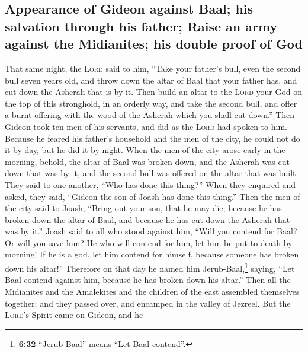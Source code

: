 \hypertarget{appearance-of-gideon-against-baal-his-salvation-through-his-father-raise-an-army-against-the-midianites-his-double-proof-of-god}{%
\subsection{Appearance of Gideon against Baal; his salvation through his
father; Raise an army against the Midianites; his double proof of
God}\label{appearance-of-gideon-against-baal-his-salvation-through-his-father-raise-an-army-against-the-midianites-his-double-proof-of-god}}

 That same night, the \textsc{Lord} said to him, ``Take
your father's bull, even the second bull seven years old, and throw down
the altar of Baal that your father has, and cut down the Asherah that is
by it.  Then build an altar to the \textsc{Lord} your God
on the top of this stronghold, in an orderly way, and take the second
bull, and offer a burnt offering with the wood of the Asherah which you
shall cut down.''  Then Gideon took ten men of his
servants, and did as the \textsc{Lord} had spoken to him. Because he
feared his father's household and the men of the city, he could not do
it by day, but he did it by night.  When the men of the
city arose early in the morning, behold, the altar of Baal was broken
down, and the Asherah was cut down that was by it, and the second bull
was offered on the altar that was built.  They said to
one another, ``Who has done this thing?'' When they enquired and asked,
they said, ``Gideon the son of Joash has done this thing.''
 Then the men of the city said to Joash, ``Bring out your
son, that he may die, because he has broken down the altar of Baal, and
because he has cut down the Asherah that was by it.'' 
Joash said to all who stood against him, ``Will you contend for Baal? Or
will you save him? He who will contend for him, let him be put to death
by morning! If he is a god, let him contend for himself, because someone
has broken down his altar!''  Therefore on that day he
named him Jerub-Baal,\footnote{\textbf{6:32} ``Jerub-Baal'' means ``Let
  Baal contend''.} saying, ``Let Baal contend against him, because he
has broken down his altar.''  Then all the Midianites and
the Amalekites and the children of the east assembled themselves
together; and they passed over, and encamped in the valley of Jezreel.
 But the \textsc{Lord}'s Spirit came on Gideon, and he
